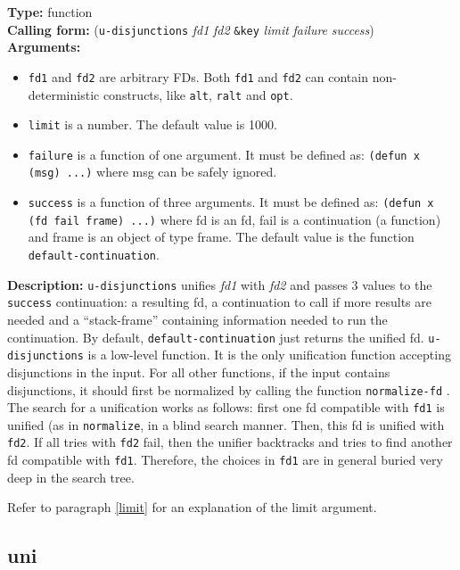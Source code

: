 \documentclass[10pt,a4paper]{report}
\begin{document}
{\bf Type:} function
\\{\bf Calling form:} ({\tt u-disjunctions} {\em fd1} {\em fd2} {\tt \&key} {\em limit}
{\em failure} {\em success})
\\{\bf Arguments:} 
\begin{itemize}
\item {\tt fd1} and {\tt fd2} are arbitrary FDs.  Both {\tt fd1} and {\tt fd2} can contain
non-deterministic constructs, like {\tt alt}, {\tt ralt} and {\tt opt}.

\item {\tt limit} is a number.  The default value is 1000.

\item {\tt failure} is a function of one argument.  It must be defined as:
{\tt (defun x (msg) ...)} where msg can be safely ignored.

\item {\tt success} is a function of three arguments. It must be defined as:
{\tt (defun x (fd fail frame) ...)} where fd is an fd, fail is a continuation
(a function) and frame is an object of type frame.  The default value is
the function {\tt default-continuation}.
\end{itemize}

{\bf Description:} {\tt u-disjunctions} unifies {\em fd1} with {\em fd2} and
passes 3 values to the {\tt success} continuation: a resulting fd, a
continuation to call if more results are needed and a ``stack-frame''
containing information needed to run the continuation.  By default,
{\tt default-continuation} just returns the unified fd.  {\tt u-disjunctions}
is a low-level function.  It is the only unification function accepting
disjunctions in the input.  For all other functions, if the input contains
disjunctions, it should first be normalized by calling the function
{\tt normalize-fd} .  The search for a unification
works as follows:  first one fd compatible with {\tt fd1} is unified (as in
{\tt normalize}, in a blind search manner.  Then, this fd is unified with
{\tt fd2}.  If all tries with {\tt fd2} fail, then the unifier backtracks and
tries to find another fd compatible with {\tt fd1}.  Therefore, the choices
in {\tt fd1} are in general buried very deep in the search tree.

Refer to paragraph \ref{limit} for an explanation of the limit argument.

\subsection{uni}
\end{document}
